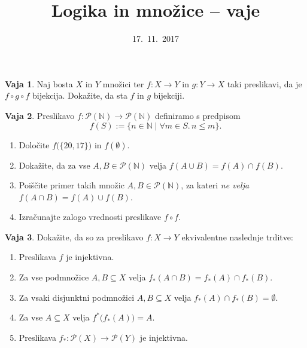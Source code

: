\documentclass{article}
\newcommand{\NN}{\mathbb{N}}
\theoremstyle{definition}
\newtheorem{vaja}{Vaja}
\begin{document}
\title{Logika in množice -- vaje}
\date{17.~11.~2017}
\maketitle

\begin{vaja}
  Naj bosta $X$ in $Y$ množici ter $f\colon X \to Y$ in $g\colon Y \to X$ taki preslikavi, da je $f \circ g \circ f$ bijekcija. Dokažite, da sta $f$ in $g$ bijekciji.
\end{vaja}

\begin{vaja}
	Preslikavo $f\colon \mathcal{P}(\NN) \to \mathcal{P}(\NN)$ definiramo s predpisom
	\[f(S) := \{n \in \mathbb{N} \mid \forall m \in S.\, n \leq m\}.\]
	\begin{enumerate}
		\item Določite $f\big(\{20,17\}\big)$ in $f(\emptyset)$.
		\item Dokažite, da za vse $A, B \in \mathcal{P}(\mathbb{N})$ velja $f(A \cup B) = f(A) \cap f(B)$.
		\item Poiščite primer takih množic $A, B \in \mathcal{P}(\mathbb{N})$, za kateri \emph{ne velja} $f(A \cap B) = f(A) \cup f(B)$.
		\item Izračunajte zalogo vrednosti preslikave $f \circ f$.
	\end{enumerate}
\end{vaja}

\begin{vaja}
  Dokažite, da so za preslikavo $f\colon X \to Y$ ekvivalentne naslednje trditve:
  \begin{enumerate}
    \item Preslikava $f$ je injektivna.
    \item Za vse podmnožice $A, B \subseteq X$ velja $f_*(A \cap B) = f_*(A) \cap f_*(B)$.
    \item Za vsaki disjunktni podmnožici $A, B \subseteq X$ velja $f_*(A) \cap f_*(B) = \emptyset$.
    \item Za vse $A \subseteq X$ velja $f^{*}\big(f_*(A)\big) = A$.
    \item Preslikava $f_* \colon \mathcal{P}(X) \to \mathcal{P}(Y)$ je injektivna.
  \end{enumerate}
\end{vaja}
\end{document}
